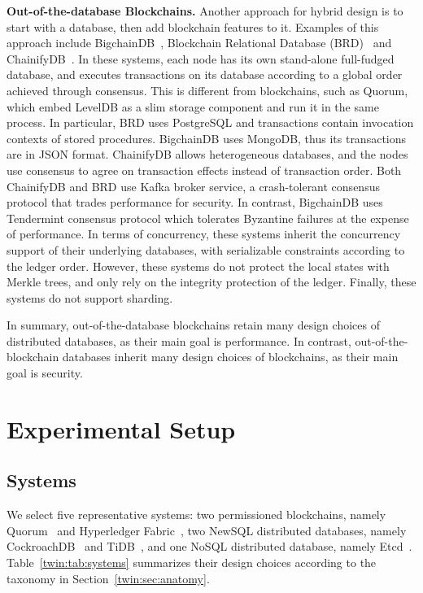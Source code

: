 \textbf{Out-of-the-database Blockchains.} Another approach for hybrid design is to start with a database,
then add blockchain features to it. Examples of this approach include
BigchainDB~\cite{mcconaghy2016bigchaindb}, Blockchain Relational Database (BRD)~\cite{BlockchainMeetsDatabase}
and ChainifyDB~\cite{schuhknecht2019chainifydb}. In these systems, each node has
its own stand-alone full-fudged database, and executes transactions on its database according to a global order achieved through
consensus. 
This is different from blockchains, such as Quorum, which embed LevelDB as a slim storage component and run it in the same process. 
In particular, BRD uses PostgreSQL and transactions contain invocation contexts of stored
procedures. BigchainDB uses MongoDB, thus its transactions are in JSON format.
ChainifyDB allows heterogeneous databases, and the nodes use consensus to agree on transaction effects instead
of transaction order. Both ChainifyDB and BRD use
Kafka broker service, a crash-tolerant consensus protocol that trades performance for security. In contrast,
BigchainDB uses Tendermint consensus protocol which tolerates Byzantine failures at the expense of performance.
In terms of concurrency, these systems inherit the concurrency support of their underlying databases, with
serializable constraints according to the ledger order.  However, these systems do not protect the local
states with Merkle trees, and only rely on the integrity protection of the ledger. 
Finally, these systems do not support sharding.

In summary, out-of-the-database blockchains retain many design choices of distributed databases, as their
main goal is performance. In contrast, out-of-the-blockchain databases inherit many design choices of
blockchains, as their main goal is security.

\section{Experimental Setup}
\label{twin:sec:setup}
\subsection{Systems}
We select five representative systems: two permissioned blockchains, namely Quorum~\cite{web:quorum} and Hyperledger Fabric~\cite{androulaki2018hyperledger}, two NewSQL distributed databases, namely CockroachDB~\cite{taft2020cockroachdb} and TiDB~\cite{huang13tidb}, and one NoSQL distributed database, namely Etcd~\cite{web:etcd}. 
Table~\ref{twin:tab:systems} summarizes their design choices according to the taxonomy in Section~\ref{twin:sec:anatomy}.


